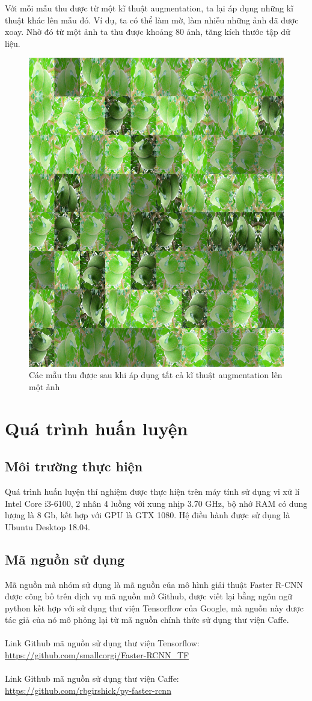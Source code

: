 Với mỗi mẫu thu được  từ một kĩ thuật augmentation, ta lại áp dụng những kĩ thuật khác lên mẫu đó. Ví dụ, ta có thể làm mờ, làm nhiễu những ảnh đã được xoay. Nhờ đó từ một ảnh ta thu được khoảng 80 ảnh, tăng kích thước tập dữ liệu.
	\begin{center}
    	\begin{figure}[H]
    	\centering
    	\includegraphics[width=0.4\columnwidth]{images/chap3/augment.jpg}
    	\caption{Các mẫu thu được sau khi áp dụng tất cả kĩ thuật augmentation lên một ảnh}
    	\label{fig:my_label}
    	\end{figure}
	\end{center}

\section{Quá trình huấn luyện}
\subsection{Môi trường thực hiện}
Quá trình huấn luyện thí nghiệm được thực hiện trên máy tính sử dụng vi xử lí Intel Core i3-6100, 2 nhân 4 luồng với xung nhịp 3.70 GHz, bộ nhớ RAM có dung lượng là 8 Gb, kết hợp với GPU là GTX 1080. Hệ điều hành được sử dụng là Ubuntu Desktop 18.04. 
\subsection{Mã nguồn sử dụng}
Mã nguồn mà nhóm sử dụng là mã nguồn của mô hình giải thuật Faster R-CNN được công bố trên dịch vụ mã nguồn mở Github, được viết lại bằng ngôn ngữ python kết hợp với sử dụng thư viện Tensorflow của Google, mà nguồn này được tác giả của nó mô phỏng lại từ mã nguồn chính thức sử dụng thư viện Caffe. \\ \\
Link Github mã nguồn sử dụng thư viện Tensorflow: \\
\url{https://github.com/smallcorgi/Faster-RCNN_TF} \\
\\
Link Github mã nguồn sử dụng thư viện Caffe: \\
\url{https://github.com/rbgirshick/py-faster-rcnn} \\
